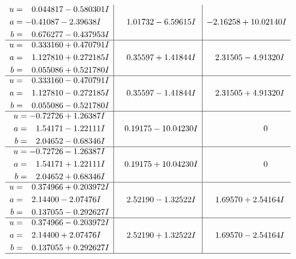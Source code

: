 \documentclass[1p]{elsarticle_modified}
\theoremstyle{definition}
\begin{document}
$$\begin{array}{c|c|c}
\begin{aligned}
u &= \phantom{-}0.044817 - 0.580301 I \\
a &= -0.41087 - 2.39638 I \\
b &= \phantom{-}0.676277 - 0.437953 I\end{aligned}
 & \phantom{-}1.01732 - 6.59615 I & -2.16258 + 10.02140 I \\ \hline\begin{aligned}
u &= \phantom{-}0.333160 + 0.470791 I \\
a &= \phantom{-}1.127810 + 0.272185 I \\
b &= \phantom{-}0.055086 + 0.521780 I\end{aligned}
 & \phantom{-}0.35597 + 1.41844 I & \phantom{-}2.31505 - 4.91320 I \\ \hline\begin{aligned}
u &= \phantom{-}0.333160 - 0.470791 I \\
a &= \phantom{-}1.127810 - 0.272185 I \\
b &= \phantom{-}0.055086 - 0.521780 I\end{aligned}
 & \phantom{-}0.35597 - 1.41844 I & \phantom{-}2.31505 + 4.91320 I \\ \hline\begin{aligned}
u &= -0.72726 + 1.26387 I \\
a &= \phantom{-}1.54171 - 1.22111 I \\
b &= \phantom{-}2.04652 - 0.68346 I\end{aligned}
 & \phantom{-}0.19175 - 10.04230 I & \phantom{-0.000000 } 0 \\ \hline\begin{aligned}
u &= -0.72726 - 1.26387 I \\
a &= \phantom{-}1.54171 + 1.22111 I \\
b &= \phantom{-}2.04652 + 0.68346 I\end{aligned}
 & \phantom{-}0.19175 + 10.04230 I & \phantom{-0.000000 } 0 \\ \hline\begin{aligned}
u &= \phantom{-}0.374966 + 0.203972 I \\
a &= \phantom{-}2.14400 - 2.07476 I \\
b &= \phantom{-}0.137055 - 0.292627 I\end{aligned}
 & \phantom{-}2.52190 - 1.32522 I & \phantom{-}1.69570 + 2.54164 I \\ \hline\begin{aligned}
u &= \phantom{-}0.374966 - 0.203972 I \\
a &= \phantom{-}2.14400 + 2.07476 I \\
b &= \phantom{-}0.137055 + 0.292627 I\end{aligned}
 & \phantom{-}2.52190 + 1.32522 I & \phantom{-}1.69570 - 2.54164 I\\
 \hline 
 \end{array}$$\newpage\newpage\renewcommand{\arraystretch}{1}
\end{document}
